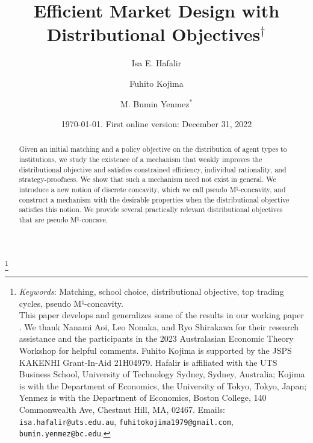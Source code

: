 \documentclass[12pt]{amsart}
\theoremstyle{remark}
\newcommand{\fk}[1]{{\color{red} FK: #1 }}
\begin{document}
\title[Efficient Market Design]{Efficient Market Design with \\ Distributional Objectives$^{\dagger}$}

\author[Hafalir, Kojima, and Yenmez]{Isa E. Hafalir \and Fuhito Kojima  \and M. Bumin Yenmez$^{*}$}



\thanks{\emph{Keywords}: Matching, school choice, distributional objective, top trading cycles, pseudo M$^{\natural}$-concavity.\\
This paper develops and generalizes some of the results in our working paper \cite{interdistrictwp}.
We thank Nanami Aoi, Leo Nonaka, and Ryo Shirakawa for their research assistance and the participants in the 2023 Australasian Economic Theory Workshop for helpful comments. Fuhito Kojima is supported by the JSPS KAKENHI Grant-In-Aid 21H04979. Hafalir is affiliated with the UTS Business School, University of Technology Sydney, Sydney, Australia; Kojima is with the Department of Economics, the University of Tokyo, Tokyo, Japan; Yenmez is with the Department of Economics, Boston College, 140 Commonwealth Ave, Chestnut Hill, MA, 02467. Emails:  \texttt{isa.hafalir@uts.edu.au}, \texttt{fuhitokojima1979@gmail.com},
\texttt{bumin.yenmez@bc.edu}.}




\begin{abstract}
Given an initial matching and a policy objective on the distribution of agent types to institutions,
we study the existence of a mechanism that weakly improves the distributional objective and satisfies constrained efficiency,
individual rationality, and strategy-proofness. We show that such a mechanism need not exist in general. We introduce a
new notion of discrete concavity, which we call pseudo M$^{\natural}$-concavity, and construct a mechanism with the desirable
properties when the distributional objective satisfies this notion. We provide several practically relevant distributional
objectives that are pseudo M$^{\natural}$-concave.
\end{abstract}

\date{\today. First online version: December 31, 2022}

\maketitle

\end{document}
